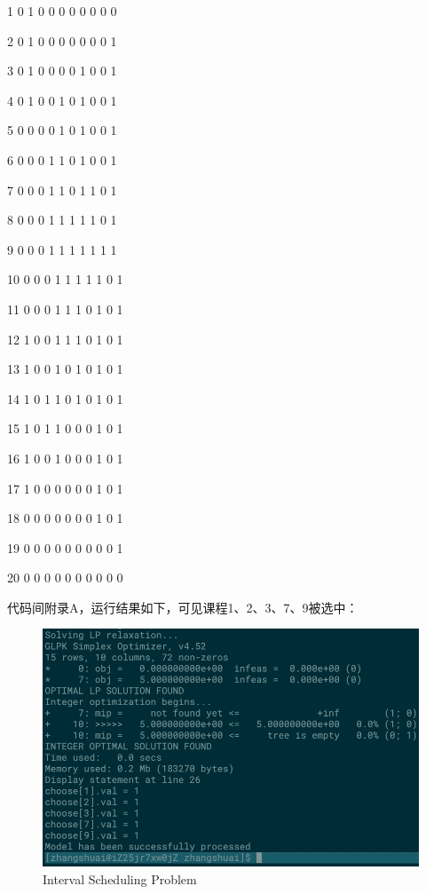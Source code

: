\documentclass[UTF8,a4paper,12pt]{article}
\begin{document}
\begin{CJK}{UTF8}{gkai}
	 1  0  1  0  0  0  0  0  0  0  0
	 
	 2  0  1  0  0  0  0  0  0  0  1
	 
	 3  0  1  0  0  0  0  1  0  0  1
	 
	 4  0  1  0  0  1  0  1  0  0  1
	 
	 5  0  0  0  0  1  0  1  0  0  1
	 
	 6  0  0  0  1  1  0  1  0  0  1
	 
	 7  0  0  0  1  1  0  1  1  0  1
	 
	 8  0  0  0  1  1  1  1  1  0  1
	 
	 9  0  0  0  1  1  1  1  1  1  1
	 
	 10  0  0  0  1  1  1  1  1  0  1
	 
	 11  0  0  0  1  1  1  0  1  0  1
	 
	 12  1  0  0  1  1  1  0  1  0  1
	 
	 13  1  0  0  1  0  1  0  1  0  1
	 
	 14  1  0  1  1  0  1  0  1  0  1
	 
	 15  1  0  1  1  0  0  0  1  0  1
	 
	 16  1  0  0  1  0  0  0  1  0  1
	 
	 17  1  0  0  0  0  0  0  1  0  1
	 
	 18  0  0  0  0  0  0  0  1  0  1
	 
	 19  0  0  0  0  0  0  0  0  0  1
	 
	 20  0  0  0  0  0  0  0  0  0  0
	
		
		代码间附录A，运行结果如下，可见课程1、2、3、7、9被选中：
		
		\begin{figure}[htb]
			\centering
			\includegraphics[scale=.7]{./schres.png}
			\caption{Interval Scheduling Problem}
		\end{figure}



\end{CJK}
\end{document}
